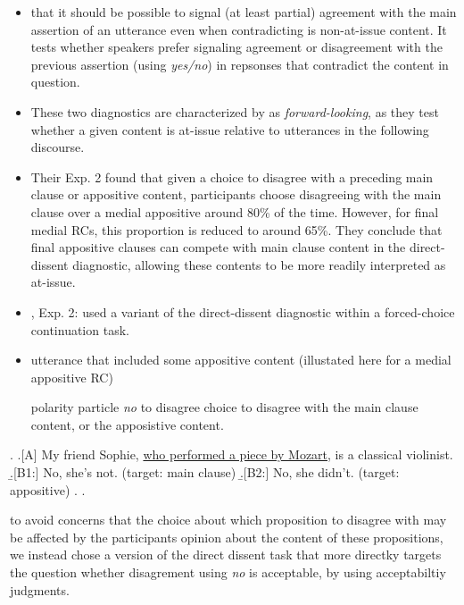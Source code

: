 \documentclass[times,linguex,xcolor]{glossa}
\begin{document}
    \begin{itemize}
      \item that it should be possible to signal (at least partial) agreement with the main assertion of an utterance even when contradicting is non-at-issue content. It tests whether speakers prefer signaling agreement or disagreement with the previous assertion (using \emph{yes/no}) in repsonses that contradict the content in question.

    \end{itemize}

    \begin{itemize}
      \item These two diagnostics are characterized by \citealt{koev_notions_2018} as \emph{forward-looking}, as they test whether a given content is at-issue relative to utterances in the following discourse.


      \item \citealt{syrett_experimental_2015} Their Exp. 2 found that given a choice to disagree with a preceding main clause or appositive content, participants choose disagreeing with the main clause over a medial appositive around 80\% of the time. However, for final medial RCs, this proportion is reduced to around 65\%. They conclude that final appositive clauses can compete with main clause content in the direct-dissent diagnostic, allowing these contents to be more readily interpreted as at-issue.

      \item \citealt{syrett_experimental_2015}, Exp. 2: used a variant of the direct-dissent diagnostic within a forced-choice continuation task. 
      \item utterance that included some appositive content (illustated here for a medial appositive RC)

      polarity particle \emph{no} to disagree  choice to disagree with the main clause content, or the apposistive content.
    \end{itemize}

    \ex. \a.[A] My friend Sophie, \underline{who performed a piece by Mozart,} is a classical violinist.
      \b.[B1:] No, she’s not. (target: main clause)
      \b.[B2:] No, she didn’t. (target: appositive)
      \z. \z. 

      to avoid concerns that the choice about which proposition to disagree with may be affected by the participants opinion about the content of these propositions, we instead chose a version of the direct dissent task that more directky targets the question whether disagrement using \emph{no} is acceptable, by using acceptabiltiy judgments.
\end{document}
